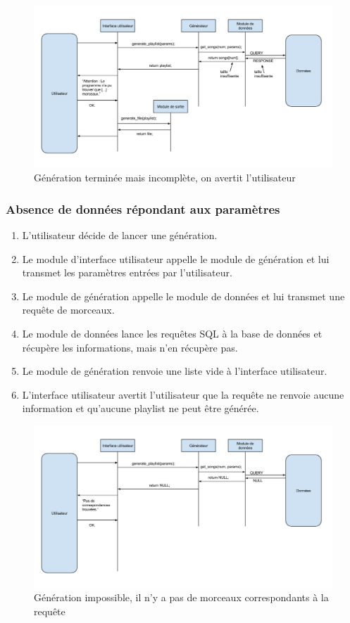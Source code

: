\documentclass[11pt,a4paper]{article}
\begin{document}
\begin{figure}[!h]
\includegraphics[width=14cm]{generation_incomplete.png}
\caption{Génération terminée mais incomplète, on avertit l'utilisateur}
\end{figure}
 

\subsubsection{Absence de données répondant aux paramètres}

\begin{enumerate}
\item L'utilisateur décide de lancer une génération.
\item Le module d'interface utilisateur appelle le module de génération et lui
transmet les paramètres entrées par l'utilisateur.
\item Le module de génération appelle le module de données et lui transmet une
requête de morceaux.
\item Le module de données lance les requêtes SQL à la base de données et
récupère les informations, mais n'en récupère pas.
\item Le module de génération renvoie une liste vide à l'interface utilisateur.
\item L'interface utilisateur avertit l'utilisateur que la requête ne renvoie
aucune information et qu'aucune playlist ne peut être générée.
\end{enumerate}

\begin{figure}[!h]
\includegraphics[width=14cm]{generation_nulle.png}
\caption{Génération impossible, il n'y a pas de morceaux correspondants à la requête}
\end{figure}
 
\end{document}
